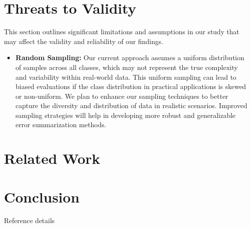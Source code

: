 \documentclass[10pt, conference, a4paper, final]{IEEEtran}
\begin{document}
\section{Threats to Validity}

This section outlines significant limitations and assumptions in our study that may affect the validity and reliability of our findings.

\begin{itemize}
    \item \textbf{Random Sampling:} Our current approach assumes a uniform distribution of samples across all classes, which may not represent the true complexity and variability within real-world data. This uniform sampling can lead to biased evaluations if the class distribution in practical applications is skewed or non-uniform. We plan to enhance our sampling techniques to better capture the diversity and distribution of data in realistic scenarios. Improved sampling strategies will help in developing more robust and generalizable error summarization methods.
\end{itemize}


\section{Related Work}

\section{Conclusion}

\begin{thebibliography}{01}
     Reference details
\end{thebibliography}
\end{document}
